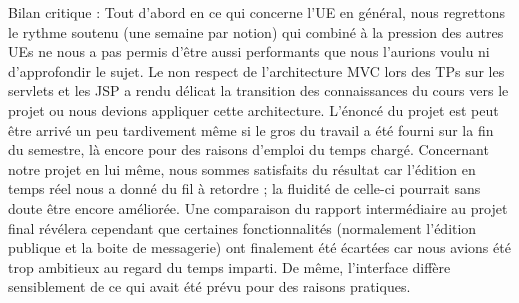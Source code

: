 \documentclass[a4paper, 12pt]{article}
\begin{document}
Bilan critique : Tout d'abord en ce qui concerne l'UE en général, nous regrettons le rythme soutenu (une semaine par notion) qui combiné à la pression des autres UEs ne nous a pas permis d'être aussi performants que nous l'aurions voulu ni d'approfondir le sujet. Le non respect de l'architecture MVC lors des TPs sur les servlets et les JSP a rendu délicat la transition des connaissances du cours vers le projet ou nous devions appliquer cette architecture. L'énoncé du projet est peut être arrivé un peu tardivement même si le gros du travail a été fourni sur la fin du semestre, là encore pour des raisons d'emploi du temps chargé.
Concernant notre projet en lui même, nous sommes satisfaits du résultat car l'édition en temps réel nous a donné du fil à retordre ; la fluidité de celle-ci pourrait sans doute être encore améliorée. Une comparaison du rapport intermédiaire au projet final révélera cependant que certaines fonctionnalités (normalement l'édition publique et la boite de messagerie) ont finalement été écartées car nous avions été trop ambitieux au regard du temps imparti. De même, l'interface diffère sensiblement de ce qui avait été prévu pour des raisons pratiques.
\end{document}
